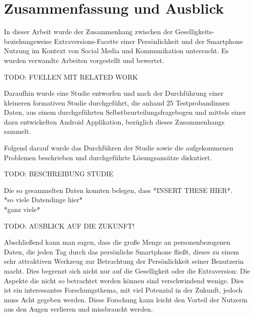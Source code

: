 
\chapter{Zusammenfassung und Ausblick}
\label{ch:Zusammenfassung}


In dieser Arbeit wurde der Zusammenhang zwischen der Geselligkeits- beziehungsweise Extraversions-Facette
einer Persönlichkeit und der Smartphone Nutzung im Kontext von Social Media und Kommunikation untersucht.
Es wurden verwandte Arbeiten vorgestellt und bewertet.
\par
TODO: FUELLEN MIT RELATED WORK
\par
Daraufhin wurde eine Studie entworfen und nach der Durchführung einer kleineren formativen Studie durchgeführt, die anhand 25 Testprobandinnen Daten, aus einem durchgeführten Selbstbeurteilungsfragebogen und
 mittels einer dazu entwickelten Android Applikation, bezüglich dieses Zusammenhangs sammelt.

Folgend darauf wurde das Durchführen der Studie sowie die aufgekommenen Problemen beschrieben und durchgeführte Lösungsansätze diskutiert.
\par
TODO: BESCHREIBUNG STUDIE
\par
Die so gesammelten Daten konnten belegen, dass *INSERT THESE HIER*.\\
*so viele Datendinge hier*\\
*ganz viele*
\par
TODO: AUSBLICK AUF DIE ZUKUNFT!
\par
Abschließend kann man sagen, dass die große Menge an personenbezogenen Daten,
die jeden Tag durch das persönliche Smartphone fließt, dieses zu einem sehr attraktiven Werkzeug zur Betrachtung der Persönlichkeit seiner Benutzerin macht.
Dies begrenzt sich nicht nur auf die Geselligkeit oder die Extraversion: Die Aspekte die nicht so betrachtet werden können sind verschwindend wenige.
Dies ist ein interessantes Forschungsthema, mit viel Potenzial in der Zukunft, jedoch muss Acht gegeben werden.
Diese Forschung kann leicht den Vorteil der Nutzerin aus den Augen verlieren und missbraucht werden. 


